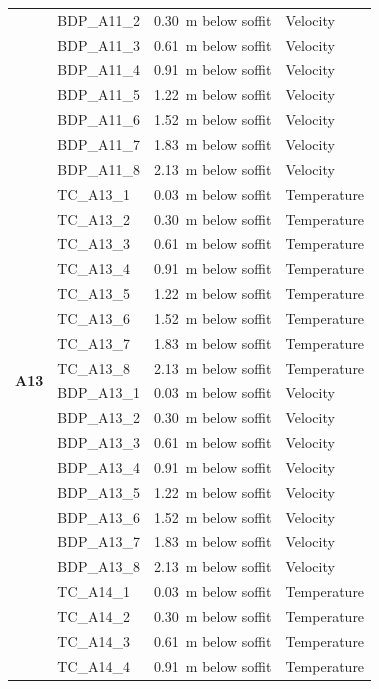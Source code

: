 \documentclass[12pt,oneside]{book}
\begin{document}
\begin{longtable}[c]{c|lll}
 & BDP\_A11\_2 & 0.30~m below soffit  & Velocity \\
 & BDP\_A11\_3 & 0.61~m below soffit  & Velocity \\
 & BDP\_A11\_4 & 0.91~m below soffit  & Velocity \\
 & BDP\_A11\_5 & 1.22~m below soffit  & Velocity \\
 & BDP\_A11\_6 & 1.52~m below soffit  & Velocity \\
 & BDP\_A11\_7 & 1.83~m below soffit  & Velocity \\
 & BDP\_A11\_8 & 2.13~m below soffit  & Velocity \\
\midrule
\multirow{16}{*}{\large{\textbf{A13}}}
 & TC\_A13\_1  & 0.03~m below soffit  & Temperature \\
 & TC\_A13\_2  & 0.30~m below soffit  & Temperature \\
 & TC\_A13\_3  & 0.61~m below soffit  & Temperature \\
 & TC\_A13\_4  & 0.91~m below soffit  & Temperature \\
 & TC\_A13\_5  & 1.22~m below soffit  & Temperature \\
 & TC\_A13\_6  & 1.52~m below soffit  & Temperature \\
 & TC\_A13\_7  & 1.83~m below soffit  & Temperature \\
 & TC\_A13\_8  & 2.13~m below soffit  & Temperature \\
\cline{2-4}
 & BDP\_A13\_1 & 0.03~m below soffit  & Velocity \\
 & BDP\_A13\_2 & 0.30~m below soffit  & Velocity \\
 & BDP\_A13\_3 & 0.61~m below soffit  & Velocity \\
 & BDP\_A13\_4 & 0.91~m below soffit  & Velocity \\
 & BDP\_A13\_5 & 1.22~m below soffit  & Velocity \\
 & BDP\_A13\_6 & 1.52~m below soffit  & Velocity \\
 & BDP\_A13\_7 & 1.83~m below soffit  & Velocity \\
 & BDP\_A13\_8 & 2.13~m below soffit  & Velocity \\
\bottomrule
\newpage
\multirow{16}{*}{\large{\textbf{A14}}}
 & TC\_A14\_1  & 0.03~m below soffit  & Temperature \\
 & TC\_A14\_2  & 0.30~m below soffit  & Temperature \\
 & TC\_A14\_3  & 0.61~m below soffit  & Temperature \\
 & TC\_A14\_4  & 0.91~m below soffit  & Temperature \\

\end{longtable}
\end{document}
